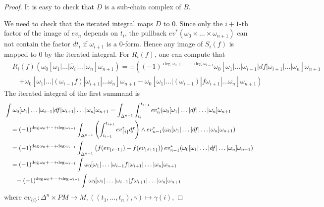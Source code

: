 \documentclass{scrartcl}
\theoremstyle{plain}
\theoremstyle{definition}
\begin{document}
\begin{proof}
    It is easy to check that $D$ is a sub-chain complex of $B$. 

    We need to check that the iterated integral maps $D$ to $0$. Since only the $i+1$-th factor of the image of $ev_n$ depends on $t_i$, the pullback $ev^*(\omega_0\times\dots\times\omega_{n+1})$ can not contain the factor $dt_i$ if $\omega_{i+1}$ is a $0$-form. Hence any image of $S_i(f)$ is mapped to $0$ by the iterated integral. For $R_i(f)$, one can compute that  
    \begin{align*}
        &R_i(f)(\omega_0[\omega_1|\dots|\hat\omega_i|\dots|\omega_{n}]\omega_{n+1}) = \pm \left( (-1)^{\deg\omega_0+\dots+\deg\omega_{i-1}} \omega_0[\omega_1|\dots| \omega_{i-1}| df| \omega_{i+1}|\dots|\omega_{n}]\omega_{n+1} \right.\\&\quad\left. + \omega_0[\omega_1|\dots|(\omega_{i-1}f)|\omega_{i+1}|\dots\omega_n]\omega_{n+1} - \omega_0[\omega_1|\dots|(\omega_{i-1})|f\omega_{i+1}|\dots\omega_n]\omega_{n+1} \right)
    \end{align*}
    The iterated integral of the first summand is 
    \begin{align*}
        &\int \omega_0[\omega_1|\dots| \omega_{i-1}| df| \omega_{i+1}|\dots|\omega_{n}]\omega_{n+1} = \int_{\Delta^{n-1}}\int_{t_i}^{t_{i+1}} ev_{n}^*(\omega_0[\omega_1|\dots|df|\dots|\omega_n]\omega_{n+1} \\
        &\quad= (-1)^{\deg\omega_0+\dots+\deg\omega_{i-1}}\int_{\Delta^{n-1}}\left(\int_{t_{i-1}}^{t_{i+1}} ev_{\{i\}}^*df\right) \wedge ev_{n-1}^*(\omega_0[\omega_1|\dots|df|\dots|\omega_n]\omega_{n+1}) \\
        &\quad= (-1)^{\deg\omega_0+\dots+\deg\omega_{i-1}}\int_{\Delta^{n-1}}\left(f(ev_{\{i-1\}})-f(ev_{\{i+1\}})\right) ev_{n-1}^*(\omega_0[\omega_1|\dots|df|\dots|\omega_n]\omega_{n+1}) \\
        &\quad= (-1)^{\deg\omega_0+\dots+\deg\omega_{i-1}} \int \omega_0[\omega_1|\dots|\omega_{i-1} f|\omega_{i+1}|\dots|\omega_{n}]\omega_{n+1} \\
        &\quad\hphantom{= }-(-1)^{\deg\omega_0+\dots+\deg\omega_{i-1}} \int \omega_0[\omega_1|\dots|\omega_{i-1} |f\omega_{i+1}|\dots|\omega_{n}]\omega_{n+1}
    \end{align*}
    where $ev_{\{i\}}\colon \Delta^n\times PM\to M, \left((t_1, \dots, t_n), \gamma\right)\mapsto \gamma(i)$,
\end{proof}
\end{document}
